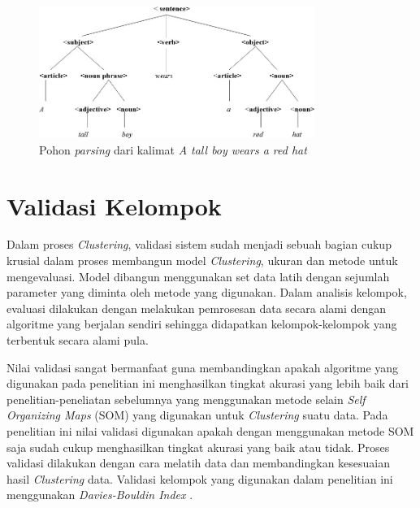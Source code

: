 \begin{figure}[h]
	\centering
	\includegraphics[width=0.8\textwidth]{Gambar/pohonparsing}
	\caption{Pohon \textit{parsing} dari kalimat \textit{A tall boy wears a red hat}}
	\label{fig:g4}
\end{figure}

\section{Validasi Kelompok}

Dalam proses \textit{Clustering}, validasi sistem sudah menjadi sebuah bagian cukup krusial dalam proses membangun model \textit{Clustering}, ukuran dan metode untuk mengevaluasi. Model dibangun menggunakan set data latih dengan sejumlah parameter yang diminta oleh metode yang digunakan. Dalam analisis kelompok, evaluasi dilakukan dengan melakukan pemrosesan data secara alami dengan algoritme yang berjalan sendiri sehingga didapatkan kelompok-kelompok yang terbentuk secara alami pula.

Nilai validasi sangat bermanfaat guna membandingkan apakah algoritme yang digunakan pada penelitian ini menghasilkan tingkat akurasi yang lebih baik dari penelitian-peneliatan sebelumnya yang menggunakan metode selain \textit{Self Organizing Maps} (SOM) yang digunakan untuk \textit{Clustering} suatu data. Pada penelitian ini nilai validasi digunakan apakah dengan menggunakan metode SOM saja sudah cukup menghasilkan tingkat akurasi yang baik atau tidak. Proses validasi dilakukan dengan cara melatih data dan membandingkan kesesuaian hasil \textit{Clustering} data. Validasi kelompok yang digunakan dalam penelitian ini menggunakan \textit{Davies-Bouldin Index} \citep{Dan2015}.

